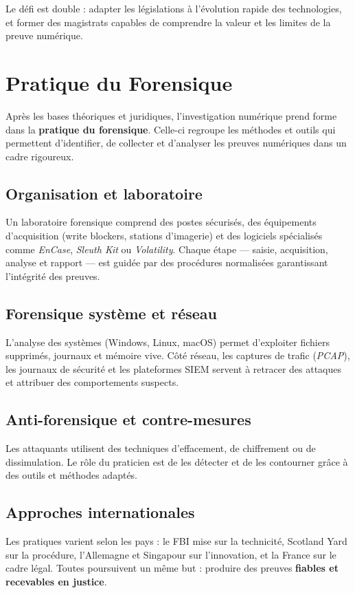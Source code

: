 \documentclass[memoire, 12pt]{report}
\begin{document}
Le défi est double : adapter les législations à l’évolution rapide des technologies, 
et former des magistrats capables de comprendre la valeur et les limites de la preuve numérique.  

\section*{Pratique du Forensique}

Après les bases théoriques et juridiques, l’investigation numérique prend forme 
dans la \textbf{pratique du forensique}. Celle-ci regroupe les méthodes et outils 
qui permettent d’identifier, de collecter et d’analyser les preuves numériques 
dans un cadre rigoureux.  

\subsection*{Organisation et laboratoire}
Un laboratoire forensique comprend des postes sécurisés, des équipements 
d’acquisition (write blockers, stations d’imagerie) et des logiciels spécialisés 
comme \emph{EnCase}, \emph{Sleuth Kit} ou \emph{Volatility}. 
Chaque étape — saisie, acquisition, analyse et rapport — est guidée par 
des procédures normalisées garantissant l’intégrité des preuves.  

\subsection*{Forensique système et réseau}
L’analyse des systèmes (Windows, Linux, macOS) permet d’exploiter 
fichiers supprimés, journaux et mémoire vive.  
Côté réseau, les captures de trafic (\emph{PCAP}), les journaux de sécurité 
et les plateformes SIEM servent à retracer des attaques et attribuer 
des comportements suspects.  

\subsection*{Anti-forensique et contre-mesures}
Les attaquants utilisent des techniques d’effacement, de chiffrement ou de dissimulation. 
Le rôle du praticien est de les détecter et de les contourner grâce à des outils 
et méthodes adaptés.  

\subsection*{Approches internationales}
Les pratiques varient selon les pays : le FBI mise sur la technicité, 
Scotland Yard sur la procédure, l’Allemagne et Singapour sur l’innovation, 
et la France sur le cadre légal.  
Toutes poursuivent un même but : produire des preuves \textbf{fiables et recevables en justice}.  
\end{document}
